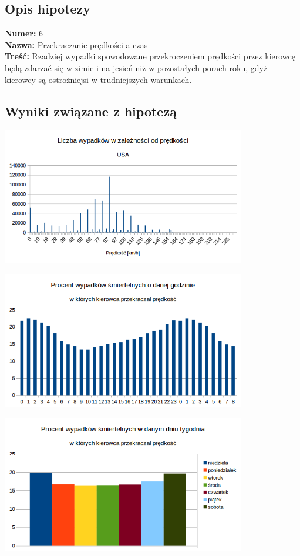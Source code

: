 \subsection{Opis hipotezy}\label{opis-hipotezy}

\textbf{Numer:} 6\\\textbf{Nazwa:} Przekraczanie prędkości a
czas\\\textbf{Treść:} Rzadziej wypadki spowodowane przekroczeniem
prędkości przez kierowcę będą zdarzać się w zimie i na jesień niż w
pozostałych porach roku, gdyż kierowcy są ostrożniejsi w trudniejszych
warunkach.

\subsection{Wyniki związane z
hipotezą}\label{wyniki-zwiazane-z-hipoteza}

\includegraphics[width=0.8\textwidth]{images/hipotheses/speed/speed.png}

\includegraphics[width=0.8\textwidth]{images/hipotheses/speed/speed_exceeded_by_hour.png}

\includegraphics[width=0.8\textwidth]{images/hipotheses/speed/speed_exceeded_by_day_of_week.png}

